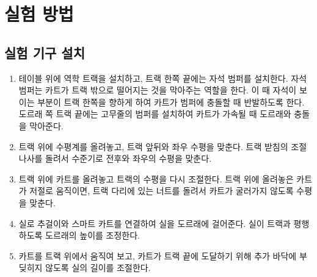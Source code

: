 \documentclass[12pt,a4paper]{article}
\begin{document}
\section{실험 방법}
\subsection{실험 기구 설치}
\begin{enumerate}
    \item 테이블 위에 역학 트랙을 설치하고, 트랙 한쪽 끝에는 자석 범퍼를 설치한다.
        자석 범퍼는 카트가 트랙 밖으로 떨어지는 것을 막아주는 역할을 한다. 이 때
        자석이 보이는 부분이 트랙 한쪽을 향하게 하여 카트가 범퍼에 충돌할 때
        반발하도록 한다. 도르래 쪽 트랙 끝에는 고무줄의 범퍼를 설치하여 카트가 가속될
        때 도르래와 충돌을 막아준다.
    \item 트랙 위에 수평계를 올려놓고, 트랙 앞뒤와 좌우 수평을 맞춘다. 트랙 받침의
        조절나사를 돌려서 수준기로 전후와 좌우의 수평을 맞춘다.
    \item 트랙 위에 카트를 올려놓고 트랙의 수평을 다시 조절한다. 트랙 위에 올려놓은
        카트가 저절로 움직이면, 트랙 다리에 있는 너트를 돌려서 카트가 굴러가지 않도록
        수평을 맞춘다.
    \item 실로 추걸이와 스마트 카트를 연결하여 실을 도르래에 걸어준다. 실이 트랙과
        평행하도록 도르래의 높이를 조정한다.
    \item 카트를 트랙 위에서 움직여 보고, 카트가 트랙 끝에 도달하기 위해 추가 바닥에
        부딪히지 않도록 실의 길이를 조절한다.
\end{enumerate}
\end{document}
